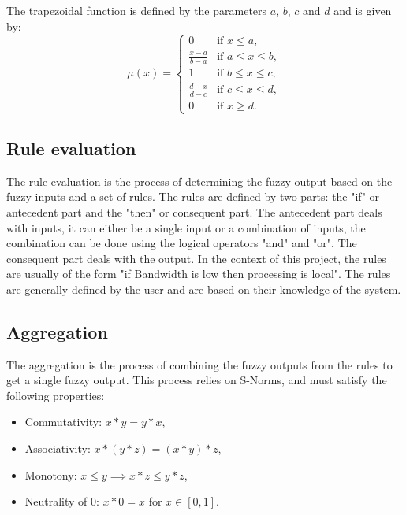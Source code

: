 The trapezoidal function is defined by the parameters $a$, $b$, $c$ and $d$ and is given by:
\begin{equation}
	\mu(x) = \begin{cases}
		0                   & \text{if } x \leq a,        \\
		\frac{x - a}{b - a} & \text{if } a \leq x \leq b, \\
		1                   & \text{if } b \leq x \leq c, \\
		\frac{d - x}{d - c} & \text{if } c \leq x \leq d, \\
		0                   & \text{if } x \geq d.
	\end{cases}
\end{equation}

\subsection{Rule evaluation}

The rule evaluation is the process of determining the fuzzy output based on the fuzzy inputs and a set of rules. The rules are defined by two parts:
the "if" or antecedent part and the "then" or consequent part. The antecedent part deals with inputs, it can either be a single input or a combination
of inputs, the combination can be done using the logical operators "and" and "or". The consequent part deals with the output. In the context of this
project, the rules are usually of the form "if Bandwidth is low then processing is local". The rules are generally defined by the user and are based
on their knowledge of the system.

\subsection{Aggregation}

The aggregation is the process of combining the fuzzy outputs from the rules to get a single fuzzy output. This process relies on S-Norms, and
must satisfy the following properties:
\begin{itemize}
	\item Commutativity: $x * y = y * x$,
	\item Associativity: $x * (y * z) = (x * y) * z$,
	\item Monotony: $x \leq y \implies x * z \leq y * z$,
	\item Neutrality of 0: $x * 0 = x$ for $x \in [0, 1]$.
\end{itemize}

